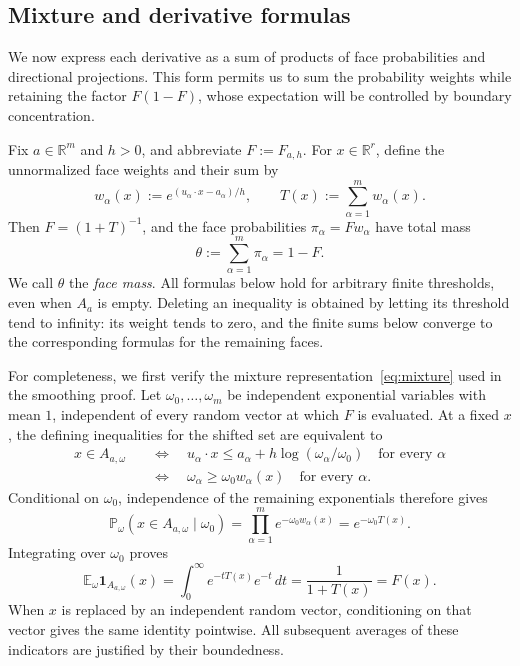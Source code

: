 \documentclass[11pt,letterpaper]{article}
\theoremstyle{remark}
\newcommand{\E}{\mathbb E}
\newcommand{\Pp}{\mathbb P}
\newcommand{\R}{\mathbb R}
\newcommand{\ind}{\mathbf 1}
\begin{document}
\subsection{\texorpdfstring{Mixture and derivative formulas}{Mixture and derivative formulas}}\label{appx-sec:mixture}

We now express each derivative as a sum of products of face
probabilities and directional projections. This form permits us to
sum the probability weights while retaining the factor $F(1-F)$,
whose expectation will be controlled by boundary concentration.

Fix $a\in\R^m$ and $h>0$, and abbreviate $F:=F_{a,h}$.
For $x\in\R^r$, define the unnormalized face weights and their sum by
\[
 w_\alpha(x):=e^{(u_\alpha\cdot x-a_\alpha)/h},
 \qquad T(x):=\sum_{\alpha=1}^m w_\alpha(x).
\]
Then $F=(1+T)^{-1}$, and the face probabilities
$\pi_\alpha=Fw_\alpha$ have total mass
\[
 \theta:=\sum_{\alpha=1}^m\pi_\alpha=1-F.
\]
We call $\theta$ the \emph{face mass}. All formulas below hold for
arbitrary finite thresholds, even when $A_a$ is empty. Deleting
an inequality is obtained by letting its threshold tend to infinity:
its weight tends to zero, and the finite sums below converge to the
corresponding formulas for the remaining faces.

For completeness, we first verify the mixture
representation~\eqref{eq:mixture} used in the smoothing proof.
Let $\omega_0,\ldots,\omega_m$ be independent exponential variables
with mean $1$, independent of every random vector at which $F$ is
evaluated. At a fixed $x$, the defining inequalities for the shifted
set are equivalent to
\[
 \begin{aligned}
 x\in A_{a,\omega}
 &\quad\Longleftrightarrow\quad
 u_\alpha\cdot x\le
 a_\alpha+h\log(\omega_\alpha/\omega_0)
       \quad\text{for every }\alpha\\
 &\quad\Longleftrightarrow\quad
 \omega_\alpha\ge\omega_0w_\alpha(x)
       \quad\text{for every }\alpha.
 \end{aligned}
\]
Conditional on $\omega_0$, independence of the remaining exponentials
therefore gives
\[
 \Pp_\omega(x\in A_{a,\omega}\mid\omega_0)
 =\prod_{\alpha=1}^m e^{-\omega_0w_\alpha(x)}
 =e^{-\omega_0T(x)}.
\]
Integrating over $\omega_0$ proves
\[
 \E_\omega\ind_{A_{a,\omega}}(x)
 =\int_0^\infty e^{-tT(x)}e^{-t}\,dt
 =\frac1{1+T(x)}=F(x).
\]
When $x$ is replaced by an independent random vector, conditioning
on that vector gives the same identity pointwise. All subsequent
averages of these indicators are justified by their boundedness.
\end{document}
